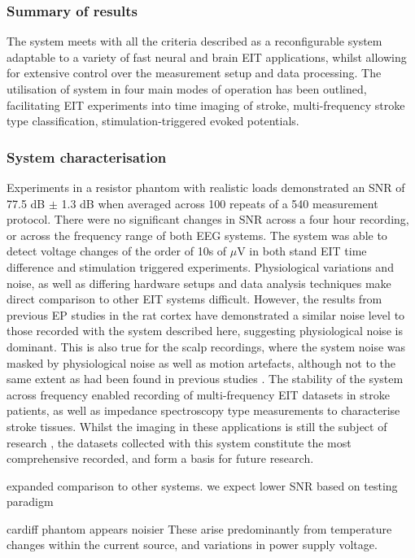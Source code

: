 \subsubsection{Summary of results}
The system meets with all the criteria described as a reconfigurable system adaptable to a variety of fast neural and brain EIT applications, whilst allowing for extensive control over the measurement setup and data processing. The utilisation of system in four main modes of operation has been outlined, facilitating EIT experiments into time imaging of stroke, multi-frequency stroke type classification, stimulation-triggered evoked potentials. 

\subsubsection{System characterisation}
Experiments in a resistor phantom with realistic loads demonstrated an SNR of 77.5 dB $\pm$ 1.3 dB when averaged across 100 repeats of a 540 measurement protocol. There were no significant changes in SNR across a four hour recording, or across the frequency range of both EEG systems. The system was able to detect voltage changes of the order of 10s of $\mu$V in both stand EIT time difference and stimulation triggered experiments. Physiological variations and noise, as well as differing hardware setups and data analysis techniques make direct comparison to other EIT systems difficult. However, the results from previous EP studies \cite{Oh2011} in the rat cortex have demonstrated a similar noise level to those recorded with the system described here, suggesting physiological noise is dominant. This is also true for the scalp recordings, where the system noise was masked by physiological noise as well as motion artefacts, although not to the same extent as had been found in previous studies \cite{Fabrizi_2006}. The stability of the system across frequency enabled recording of multi-frequency EIT datasets in stroke patients, as well as impedance spectroscopy type measurements to characterise stroke tissues. Whilst the imaging in these applications is still the subject of research \cite{malone2015} \cite{jang2015detection}, the datasets collected with this system constitute the most comprehensive recorded, and form a basis for future research. 


expanded comparison to other systems. we expect lower SNR based on testing paradigm

cardiff phantom appears noisier
These arise predominantly from temperature changes within the current source, and variations in power supply voltage.

